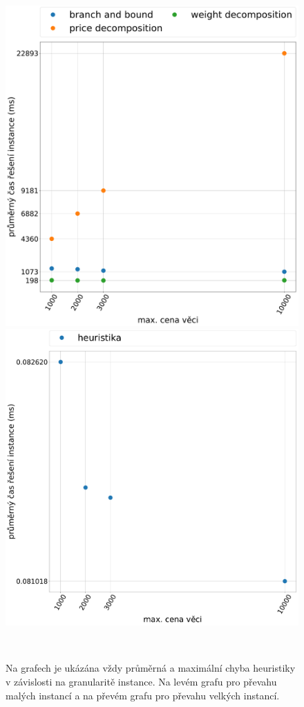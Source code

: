 \documentclass[11pt]{article}
\begin{document}
\begin{figure}
	\centering
    \begin{minipage}[c]{0.49\textwidth}
        \centering\includegraphics[width=\textwidth]{img/CE.pdf} 
    \end{minipage}
    \begin{minipage}[c]{0.49\textwidth}
        \centering \includegraphics[width=\textwidth]{img/CH.pdf} 
    \end{minipage}
    \\
   \caption{Na grafech je ukázána vždy průměrná a maximální chyba heuristiky v závislosti na granularitě instance. Na levém grafu pro převahu malých instancí a na převém grafu pro převahu velkých instancí.}\label{fig:GOEI}
    \end{figure} 
\end{document}
